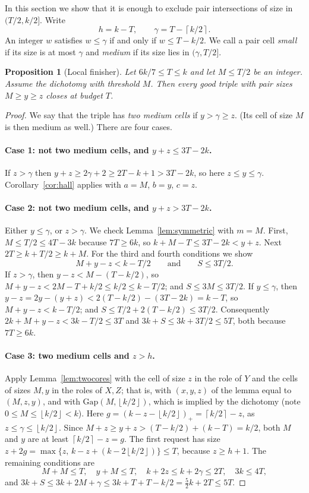 \documentclass[11pt]{article}
\numberwithin{equation}{section}
\newtheorem{proposition}[theorem]{Proposition}
\theoremstyle{definition}
\theoremstyle{remark}
\newcommand{\ceil}[1]{\left\lceil #1\right\rceil}
\newcommand{\floor}[1]{\left\lfloor #1\right\rfloor}
\newcommand{\Gap}{\mathrm{Gap}}
\begin{document}
In this section we show that it is enough to exclude pair intersections
of size in $(T/2,k/2]$. Write
\[
 h=k-T,\qquad \gamma=T-\ceil{k/2}.
\]
An integer $w$ satisfies $w\le\gamma$ if and only if $w\le T-k/2$. We
call a pair cell \emph{small} if its size is at most $\gamma$ and
\emph{medium} if its size lies in $(\gamma,T/2]$.

\begin{proposition}[Local finisher]\label{prop:localfinish}
Let $6k/7\le T\le k$ and let $M\le T/2$ be an integer. Assume the
dichotomy with threshold $M$. Then every good triple with pair sizes
$M\ge y\ge z$ closes at budget $T$.
\end{proposition}

\begin{proof}
We say that the triple has \emph{two medium cells} if $y>\gamma\ge z$.
(Its cell of size $M$ is then medium as well.) There are four cases.

\paragraph{Case 1: not two medium cells, and $y+z\le3T-2k$.}
If $z>\gamma$ then $y+z\ge2\gamma+2\ge2T-k+1>3T-2k$, so here $z\le y\le\gamma$.
Corollary~\ref{cor:hall} applies with $a=M$, $b=y$, $c=z$.

\paragraph{Case 2: not two medium cells, and $y+z>3T-2k$.}
Either $y\le\gamma$, or $z>\gamma$. We check
Lemma~\ref{lem:symmetric} with $m=M$. First, $M\le T/2\le4T-3k$ because
$7T\ge6k$, so $k+M-T\le3T-2k<y+z$. Next $2T\ge k+T/2\ge k+M$. For the
third and fourth conditions we show
\[
 M+y-z<k-T/2\qquad\text{and}\qquad S\le3T/2 .
\]
If $z>\gamma$, then $y-z<M-(T-k/2)$, so $M+y-z<2M-T+k/2\le k/2\le k-T/2$;
and $S\le3M\le3T/2$. If $y\le\gamma$, then $y-z=2y-(y+z)<2(T-k/2)-(3T-2k)=k-T$,
so $M+y-z<k-T/2$; and $S\le T/2+2(T-k/2)\le3T/2$. Consequently
$2k+M+y-z<3k-T/2\le3T$ and $3k+S\le3k+3T/2\le5T$, both because $7T\ge6k$.

\paragraph{Case 3: two medium cells and $z>h$.}
Apply Lemma~\ref{lem:twocores} with the cell of size $z$ in the role of
$Y$ and the cells of sizes $M,y$ in the roles of $X,Z$; that is, with
$(x,y,z)$ of the lemma equal to $(M,z,y)$, and with $\Gap(M,\floor{k/2})$,
which is implied by the dichotomy (note $0\le M\le\floor{k/2}<k$). Here
$g=(k-z-\floor{k/2})_+=\ceil{k/2}-z$, as $z\le\gamma\le\floor{k/2}$. Since
$M+z\ge y+z>(T-k/2)+(k-T)=k/2$, both $M$ and $y$ are at least
$\ceil{k/2}-z=g$. The first request has size
$z+2g=\max\{z,\,k-z+(k-2\floor{k/2})\}\le T$, because $z\ge h+1$. The
remaining conditions are
\[
 M+M\le T,\quad y+M\le T,\quad k+2z\le k+2\gamma\le2T,\quad 3k\le4T,
\]
and $3k+S\le3k+2M+\gamma\le3k+T+T-k/2=\tfrac52k+2T\le5T$.


\end{proof}
\end{document}
